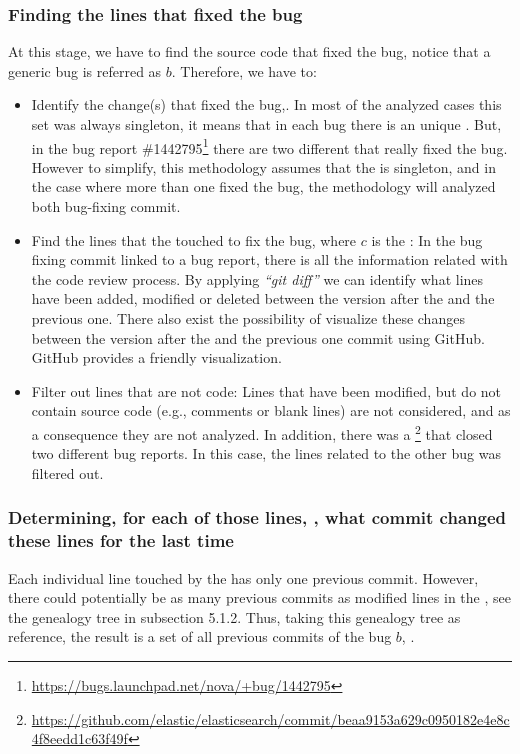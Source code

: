 \documentclass[a4paper, 12pt]{book}
\begin{document}
\subsubsection{Finding the lines that fixed the bug}

At this stage, we have to find the source code that fixed the bug, notice that a generic bug is referred as $b$. Therefore, we have to:
	\begin{itemize}
		\item Identify the change(s) that fixed the bug,. In most of the analyzed cases this set was always singleton, it means that in each bug there is an unique \BFC. But, in the bug report \#1442795\footnote{\url{https://bugs.launchpad.net/nova/+bug/1442795}} there are two different \BFC that really fixed the bug. However to simplify, this methodology assumes that the  is singleton, and in the case where more than one \BFC fixed the bug, the methodology will analyzed both bug-fixing commit.
		\item Find the lines that the  touched to fix the bug,  where $c$ is the \BFC:
	In the bug fixing commit linked to a bug report, there is all the information related with the code review process. By applying \textit{``git diff''} we can identify what lines have been added, modified or deleted between the version after the  and the previous one. There also exist the possibility of visualize these changes between the version after the  and the previous one
 commit using GitHub. GitHub provides a friendly visualization.
 		\item Filter out lines that are not code:
		Lines that have been modified, but do not contain source code (e.g., comments or blank lines) are not considered, and as a consequence they are not analyzed. In addition, there was a \BFC\footnote{\url{https://github.com/elastic/elasticsearch/commit/beaa9153a629c0950182e4e8c4f8eedd1c63f49f}} that closed two different bug reports. In this case, the lines related to the other bug was filtered out.	
	\end{itemize}

\subsubsection{Determining, for each of those lines, , what commit changed these lines for the last time}

Each individual line touched by the \BFC has only one previous commit. However, there could potentially be as many previous commits as modified lines in the \BFC, see the genealogy tree in subsection 5.1.2. Thus, taking this genealogy tree as reference, the result is a set of all previous commits of the bug $b$, .  
\end{document}
